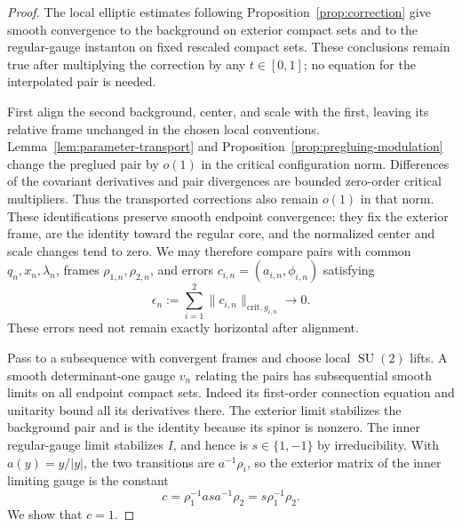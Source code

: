 \documentclass[11pt]{amsart}
\theoremstyle{definition}
\theoremstyle{remark}
\theoremstyle{plain}
\newcommand{\SU}{\operatorname{SU}}
\begin{document}
\begin{proof}
The local elliptic estimates following Proposition~\ref{prop:correction}
give smooth convergence to the background on exterior compact sets and
to the regular-gauge instanton on fixed rescaled compact sets.  These
conclusions remain true after multiplying the correction by any
$t\in[0,1]$; no equation for the interpolated pair is needed.

First align the second background, center, and scale with the first,
leaving its relative frame unchanged in the chosen local conventions.
Lemma~\ref{lem:parameter-transport} and
Proposition~\ref{prop:pregluing-modulation} change the preglued pair by
$o(1)$ in the critical configuration norm.  Differences of the covariant
derivatives and pair divergences are bounded zero-order critical
multipliers.  Thus the transported corrections also remain $o(1)$ in
that norm.  These identifications preserve smooth endpoint convergence:
they fix the exterior frame, are the identity toward the regular core,
and the normalized center and scale changes tend to zero.
We may therefore compare pairs with common $q_n,x_n,\lambda_n$, frames
$\rho_{1,n},\rho_{2,n}$, and errors
$c_{i,n}=(a_{i,n},\phi_{i,n})$ satisfying
\[
 \epsilon_n:=\sum_{i=1}^2\|c_{i,n}\|_{\mathrm{crit},g_{i,n}}
 \longrightarrow0.
\]
These errors need not remain exactly horizontal after alignment.

Pass to a subsequence with convergent frames and choose local $\SU(2)$
lifts.  A smooth determinant-one gauge $v_n$ relating the pairs has
subsequential smooth limits on all endpoint compact sets.  Indeed its
first-order connection equation and unitarity bound all its derivatives
there.  The exterior limit stabilizes the background pair and is the
identity because its spinor is nonzero.  The inner regular-gauge limit
stabilizes $I$, and hence is $s\in\{1,-1\}$ by irreducibility.  With
$a(y)=y/|y|$, the two transitions are $a^{-1}\rho_i$, so the exterior
matrix of the inner limiting gauge is the constant
\begin{equation}\label{eq:frame-endpoint-constant}
 c=\rho_1^{-1}a s a^{-1}\rho_2=s\rho_1^{-1}\rho_2.
\end{equation}
We show that $c=1$.


\end{proof}
\end{document}
